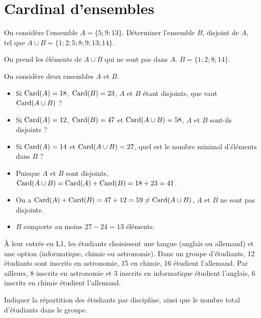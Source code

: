 \documentclass[11pt,fleqn, openany]{book} %
\begin{document}
\section*{Cardinal d'ensembles}

\begin{exercise}On considère l'ensemble $A=\{5;9;13\}$. Déterminer l'ensemble $B$, disjoint de $A$, tel que $A\cup B =\{1;2;5;8;9;13;14\}$.\end{exercise}

\begin{solution} On prend les éléments de $A \cup B$ qui ne sont pas dans $A$. $B=\{1;2;8;14\}$.\end{solution}


\begin{exercise}On considère deux ensembles $A$ et $B$.
\begin{itemize}
\item Si $\mathrm{Card}(A)=18$, $\mathrm{Card}(B)=23$, $A$ et $B$ étant disjoints, que vaut $\mathrm{Card}(A \cup B)$ ?
\item Si $\mathrm{Card}(A)=12$, $\mathrm{Card}(B)=47$ et $\mathrm{Card}(A \cup B) = 58$, $A$ et $B$ sont-ils disjoints ?
\item Si $\mathrm{Card}(A)=14$ et $\mathrm{Card}(A \cup B) = 27$, quel est le nombre minimal d'éléments dans $B$ ?
\end{itemize}\end{exercise}

\begin{solution}\hspace{0pt}
\begin{itemize}
\item Puisque $A$ et $B$ sont disjoints, $\mathrm{Card}(A \cup B)=\mathrm{Card}(A) + \mathrm{Card}(B) = 18 + 23 = 41$.
\item On a $\mathrm{Card}(A)+\mathrm{Card}(B)=47+12=59 \neq \mathrm{Card}(A \cup B)$, $A$ et $B$ ne sont pas disjoints.
\item $B$ comporte au moins $27-24=13$ éléments.\end{itemize}
\end{solution}



\begin{exercise}À leur entrée en L1, les étudiants choisissent une langue (anglais ou allemand) et une option (informatique, chimie ou astronomie). Dans un groupe d'étudiants, 12 étudiants sont inscrits en astronomie, 15 en chimie, 16 étudient l'allemand. Par ailleurs, 8 inscrits en astronomie et 3 inscrits en informatique étudient l'anglais, 6 inscrits en chimie étudient l'allemand.

Indiquer la répartition des étudiants par discipline, ainsi que le nombre total d'étudiants dans le groupe.\end{exercise}
\end{document}
